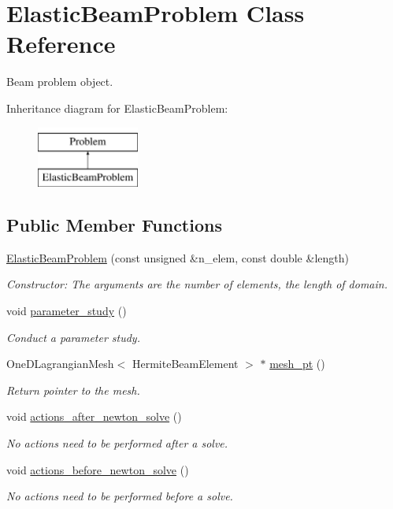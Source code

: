 \hypertarget{classElasticBeamProblem}{}\section{Elastic\+Beam\+Problem Class Reference}
\label{classElasticBeamProblem}


Beam problem object.  


Inheritance diagram for Elastic\+Beam\+Problem\+:\begin{figure}[H]
\begin{center}
\leavevmode
\includegraphics[height=2.000000cm]{classElasticBeamProblem}
\end{center}
\end{figure}
\subsection*{Public Member Functions}
\begin{DoxyCompactItemize}
\item 
\hyperlink{classElasticBeamProblem_a1c62c2a14c9a5528a649700d16dac2ea}{Elastic\+Beam\+Problem} (const unsigned \&n\+\_\+elem, const double \&length)
\begin{DoxyCompactList}\small\item\em Constructor\+: The arguments are the number of elements, the length of domain. \end{DoxyCompactList}\item 
void \hyperlink{classElasticBeamProblem_a2da3cb02ce953da67fb27742e20774a5}{parameter\+\_\+study} ()
\begin{DoxyCompactList}\small\item\em Conduct a parameter study. \end{DoxyCompactList}\item 
One\+D\+Lagrangian\+Mesh$<$ Hermite\+Beam\+Element $>$ $\ast$ \hyperlink{classElasticBeamProblem_ae7d14ba8bec2325a82cbeed0c1b29910}{mesh\+\_\+pt} ()
\begin{DoxyCompactList}\small\item\em Return pointer to the mesh. \end{DoxyCompactList}\item 
void \hyperlink{classElasticBeamProblem_a30dde8d0101a3d3994965d6e560cb585}{actions\+\_\+after\+\_\+newton\+\_\+solve} ()
\begin{DoxyCompactList}\small\item\em No actions need to be performed after a solve. \end{DoxyCompactList}\item 
void \hyperlink{classElasticBeamProblem_a5b534c11d9b1d54123bf587aad5f98f6}{actions\+\_\+before\+\_\+newton\+\_\+solve} ()
\begin{DoxyCompactList}\small\item\em No actions need to be performed before a solve. \end{DoxyCompactList}\end{DoxyCompactItemize}
